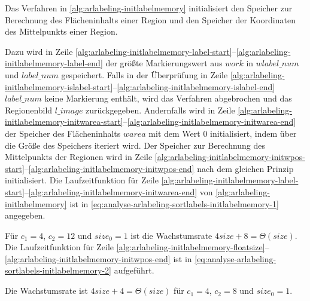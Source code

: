 Das Verfahren in \autoref{alg:arlabeling-initlabelmemory} initialisiert den Speicher zur Berechnung des Flächeninhalts
 einer Region und den Speicher der Koordinaten des Mittelpunkts einer Region.

Dazu wird in Zeile
 \ref{alg:arlabeling-initlabelmemory-label-start}--\ref{alg:arlabeling-initlabelmemory-label-end} der größte
 Markierungswert aus $\mathit{work}$ in $\mathit{wlabel\_num}$ und $\mathit{label\_num}$ gespeichert. Falls in der
 Überprüfung in Zeile
 \ref{alg:arlabeling-initlabelmemory-islabel-start}--\ref{alg:arlabeling-initlabelmemory-islabel-end}
 $\mathit{label\_num}$ keine Markierung enthält, wird das Verfahren abgebrochen und das Regionenbild $\mathit{l\_image}$
 zurückgegeben. Andernfalls wird in Zeile
 \ref{alg:arlabeling-initlabelmemory-initwarea-start}--\ref{alg:arlabeling-initlabelmemory-initwarea-end} der Speicher
 des Flächeninhalts $\mathit{warea}$ mit dem Wert $0$ initialisiert, indem über die Größe des Speichers iteriert wird.
 Der Speicher zur Berechnung des Mittelpunkts der Regionen wird in Zeile
 \ref{alg:arlabeling-initlabelmemory-initwpos-start}--\ref{alg:arlabeling-initlabelmemory-initwpos-end} nach dem
 gleichen Prinzip initialisiert. Die Laufzeitfunktion für Zeile
 \ref{alg:arlabeling-initlabelmemory-label-start}--\ref{alg:arlabeling-initlabelmemory-initwarea-end} von
 \autoref{alg:arlabeling-initlabelmemory} ist in \autoref{eq:analyse-arlabeling-sortlabels-initlabelmemory-1} angegeben.

Für $c_{1} = 4$, $c_{2} = 12$ und $\mathit{size}_{0} = 1$ ist die Wachstumsrate
 $4\mathit{size} + 8 = \Theta(\mathit{size})$. Die Laufzeitfunktion für Zeile
 \ref{alg:arlabeling-initlabelmemory-floatsize}--\ref{alg:arlabeling-initlabelmemory-initwpos-end} ist in
 \autoref{eq:analyse-arlabeling-sortlabels-initlabelmemory-2} aufgeführt.

Die Wachstumsrate ist $4\mathit{size} + 4 = \Theta(\mathit{size})$ für $c_{1} = 4$, $c_{2} = 8$ und
 $\mathit{size}_{0} = 1$.

